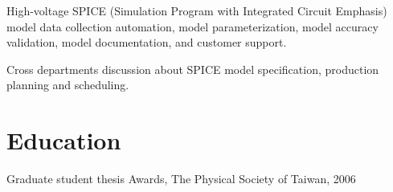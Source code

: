 \documentclass[letterpaper]{deedy-resume-openfont}
\begin{document}
\begin{tightemize}
\item High-voltage SPICE (Simulation Program with Integrated Circuit Emphasis) model data collection automation, model parameterization, model accuracy validation, model documentation, and customer support.
\item Cross departments discussion about SPICE model specification, production planning and scheduling.
\end{tightemize}
\sectionsep


\section{Education} 

\begin{tightemize}
\item \href{https://hdl.handle.net/11244/299774}{\color{link}{Dissertation link}}
\end{tightemize}
\sectionsep

\begin{tightemize}
\item \href{http://www.airitilibrary.com/Publication/alDetailedMesh1?DocID=U0001-1407200616551200}{\color{link}{Thesis link}}
\item Graduate student thesis Awards, The Physical Society of Taiwan, 2006
\end{tightemize}
\sectionsep

\end{document}
